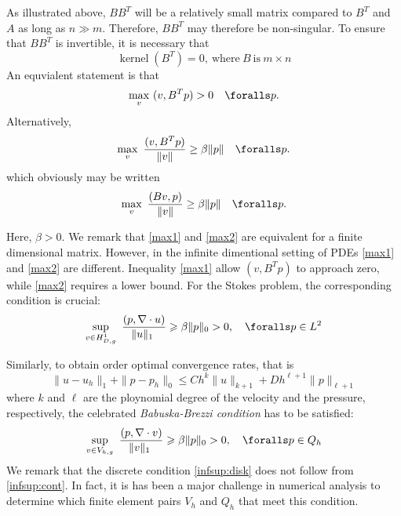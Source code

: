 As illustrated above, $B B^T$ will be a relatively small matrix compared to
$B^T$ and $A$ as long as $n  \gg m$. Therefore, $B B^T$  may therefore be non-singular.
To ensure that $B B^T$ is invertible, it is necessary that
\[\operatorname{kernel}(B^T)=0,\ \textrm{where}\ B \ \textrm{is}\ m\times n\]
An equvialent statement is that
\begin{equation}
\max_v\ (v,B^Tp) > 0\quad \foralls p .
\label{max1}
\end{equation}
Alternatively,
\begin{equation}
\max_v\ \frac{(v,B^Tp)}{\|v\| } \ge \beta \|p\| \quad \foralls p.
\label{max2}
\end{equation}
which obviously may be written 
\begin{equation}
\max_v\ \frac{(B v,p)}{\|v\| } \ge \beta \|p\| \quad \foralls p.
\label{max22}
\end{equation}

Here, $\beta > 0$. We remark that \eqref{max1} and \eqref{max2} are equivalent for a finite dimensional matrix.
However, in the infinite dimentional setting of PDEs \eqref{max1} and \eqref{max2} are different.
Inequality \eqref{max1} allow $(v, B^T p)$ to approach zero, while \eqref{max2} requires a lower bound.
For the Stokes problem, the corresponding condition is crucial:
\begin{equation}
\sup_{v\in H^1_{D,g}}\ \frac{(p, \nabla\cdot u) }{\|u\|_1\ } \geqslant \beta \|p\|_0 > 0, \quad  \foralls p\in L^2
\label{infsup:cont}
\end{equation}

Similarly, to obtain order optimal convergence rates, that is
\[\|u-u_h\|_1 + \|p-p_h\|_0 \leqslant Ch^k\|u\|_{k+1} + Dh^{\ell+1}\|p\|_{\ell+1}\]
where $k$ and $\ell$ are the ploynomial degree of the velocity and the pressure, respectively,
the celebrated \emph{Babuska-Brezzi condition} has to be satisfied:
\begin{equation}
\sup_{v\in V_{h,g}}\ \frac{(p, \nabla\cdot v) }{\|v\|_1\ } \geqslant \beta \|p\|_0 > 0, \quad  \foralls p\in Q_h
\label{infsup:disk}
\end{equation}
We remark that the discrete condition \eqref{infsup:disk} does not follow from \eqref{infsup:cont}.
In fact, it is has been a major challenge in numerical analysis
to determine which finite element pairs $V_h$ and $Q_h$ that meet this condition.

